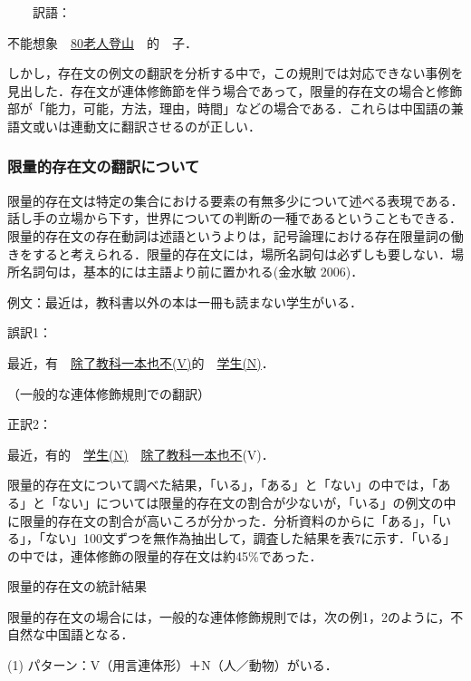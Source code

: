\documentclass[japanese]{jnlp_1.4}
\begin{document}
　　訳語：\begin{簡体中文}不能想象　\ul{\mbox{80}老人登山}　的　子．\end{簡体中文}

しかし，存在文の例文の翻訳を分析する中で，この規則では対応できない事例を見出した．存在文が連体修飾節を伴う場合であって，限量的存在文の場合と修飾部が「能力，可能，方法，理由，時間」などの場合である．これらは中国語の兼語文或いは連動文に翻訳させるのが正しい．



\subsubsection{限量的存在文の翻訳について}

限量的存在文は特定の集合における要素の有無多少について述べる表現である．話し手の立場から下す，世界についての判断の一種であるということもできる．限量的存在文の存在動詞は述語というよりは，記号論理における存在限量詞の働きをすると考えられる．限量的存在文には，場所名詞句は必ずしも要しない．場所名詞句は，基本的には主語より前に置かれる(金水敏 2006)．

例文：最近は，教科書以外の本は一冊も読まない学生がいる．

誤訳1：\begin{簡体中文}最近，有　\ul{\mbox{除了教科一本也不(V)}}的　\ul{\mbox{学生(N)}}．\end{簡体中文}（一般的な連体修飾規則での翻訳）

正訳2：\begin{簡体中文}最近，有的　\ul{\mbox{学生(N)}}　\ul{除了教科\mbox{}一本\mbox{}也不\mbox{}}(V)．\end{簡体中文}

限量的存在文について調べた結果，「いる」，「ある」と「ない」の中では，「ある」と「ない」については限量的存在文の割合が少ないが，「いる」の例文の中に限量的存在文の割合が高いころが分かった．分析資料のからに「ある」，「いる」，「ない」100文ずつを無作為抽出して，調査した結果を表7に示す．「いる」の中では，連体修飾の限量的存在文は約45\%であった．

\begin{table}[b]
\caption{限量的存在文の統計結果}

\end{table}


限量的存在文の場合には，一般的な連体修飾規則では，次の例1，2のように，不自然な中国語となる．

\noindent
(1) パターン：V（用言連体形）＋N（人／動物）がいる．
\end{document}
